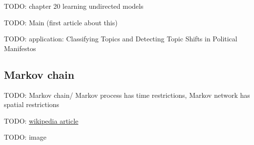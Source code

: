 TODO: \cite{koller2009probabilistic} chapter 20 learning undirected models

TODO: Main (first article about this) \cite{richardson2006markov}

TODO: application: Classifying Topics and Detecting Topic Shifts in Political Manifestos \cite{zirn2016classifying}

\subsection{Markov chain}

TODO: Markov chain/ Markov process has time restrictions, Markov network has spatial restrictions

TODO: \href{https://en.wikipedia.org/wiki/Markov_chain}{wikipedia article}

TODO: image



